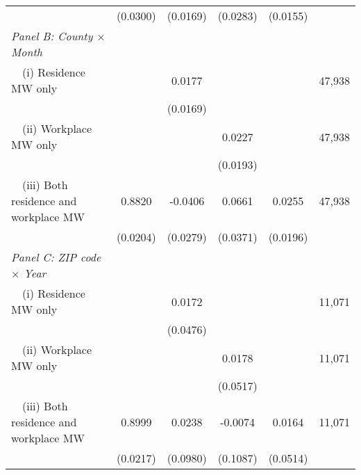 \begin{landscape}
\begin{table}[ht!]
\begin{tabular}{@{}lccccc@{}}
                                                             & (0.0300) & (0.0169) & (0.0283) & (0.0155) &      \\
        \textit{Panel B: County $\times$ Month}              &       &       &       &       &      \\
        $\quad$(i) Residence MW only                         &       &  0.0177  &       &       & 47,938 \\
                                                             &       & (0.0169) &       &       &      \\
        $\quad$(ii) Workplace MW only                        &       &       &  0.0227  &       & 47,938 \\
                                                             &       &       & (0.0193) &       &      \\
        $\quad$(iii) Both residence and workplace MW         &  0.8820  &  -0.0406  &  0.0661  &  0.0255  & 47,938 \\
                                                             & (0.0204) & (0.0279) & (0.0371) & (0.0196) &      \\
        \textit{Panel C: ZIP code $\times$ Year}             &       &       &       &       &      \\
        $\quad$(i) Residence MW only                         &       &  0.0172  &       &       & 11,071 \\
                                                             &       & (0.0476) &       &       &      \\
        $\quad$(ii) Workplace MW only                        &       &       &  0.0178  &       & 11,071 \\
                                                             &       &       & (0.0517) &       &      \\
        $\quad$(iii) Both residence and workplace MW         &  0.8999  &  0.0238  &  -0.0074  &  0.0164  & 11,071 \\
                                                             & (0.0217) & (0.0980) & (0.1087) & (0.0514) &      \\ \bottomrule
    \end{tabular}
    

\end{table}
\end{landscape}
